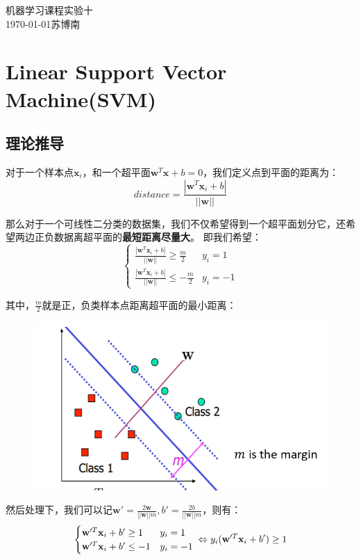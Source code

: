 \documentclass{article}
\begin{document}
\begin{center}
    \huge{机器学习课程实验十}\\
    \large{\today \quad 苏博南}
\end{center}
\section{Linear Support Vector Machine(SVM)}
\subsection{理论推导}

对于一个样本点$\textbf{x}_i$，和一个超平面$\textbf{w}^T\textbf{x}+b=0$，我们定义点到平面的距离为：
\begin{equation}
	distance=\frac{|\textbf{w}^T\textbf{x}_i+b|}{||\textbf{w}||}
\end{equation}

那么对于一个可线性二分类的数据集，我们不仅希望得到一个超平面划分它，还希望两边正负数据离超平面的\textbf{最短距离尽量大}。
即我们希望：
\begin{equation}
	\begin{cases}
		\frac{|\textbf{w}^T\textbf{x}_i+b|}{||\textbf{w}||}\geq\frac{m}{2} & y_i=1\\
		\frac{|\textbf{w}^T\textbf{x}_i+b|}{||\textbf{w}||}\leq-\frac{m}{2} & y_i=-1
	\end{cases}
\end{equation}

其中，$\frac{m}{2}$就是正，负类样本点距离超平面的最小距离：
\begin{figure}[H]
	\centering
	\includegraphics[width=0.6\linewidth]{4.png}
\end{figure}

然后处理下，我们可以记$\textbf{w}'=\frac{2\textbf{w}}{||\textbf{w}||m},b'=\frac{2b}{||\textbf{w}||m}$，则有：
\begin{equation}
	\begin{cases}
		\textbf{w}'^T\textbf{x}_i+b'\geq 1 & y_i=1\\
		\textbf{w}'^T\textbf{x}_i+b'\leq-1 & y_i=-1
	\end{cases}\\
	\Leftrightarrow y_i(\textbf{w}'^T\textbf{x}_i+b')\geq 1
\end{equation}
\end{document}
